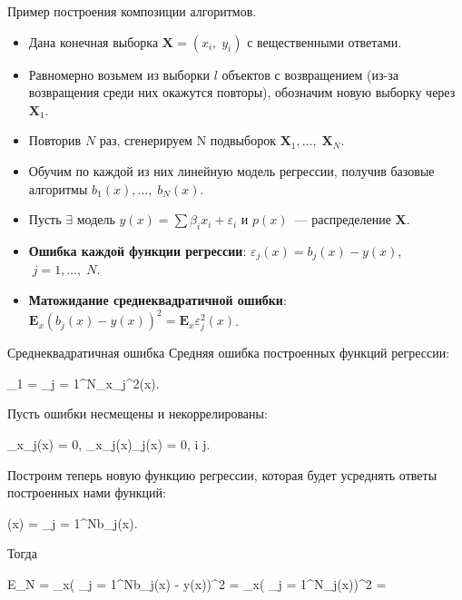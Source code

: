 \documentclass[notheorems, handout]{beamer}
\begin{document}
\begin{frame}{Пример построения композиции алгоритмов.}
	\begin{itemize}
		\item Дана конечная выборка $\mathbf{X} = (x_{i}{,}\;y_{i})$ с вещественными ответами.
		\item Равномерно возьмем из выборки $l$ объектов с возвращением (из-за возвращения среди них окажутся повторы), обозначим новую выборку через $\mathbf{X}_{1}$.
		\item Повторив $N$ раз, сгенерируем N подвыборок $\mathbf{X}_{1}{,} \dots{,}\; \mathbf{X}_{N}$.
		\item Обучим по каждой из  них линейную модель регрессии, получив базовые алгоритмы $b_{1}(x), \dots,\; b_{N}(x)$.
		\item Пусть $\exists$ модель $y(x) = \displaystyle\sum \beta_{i}x_{i} + \varepsilon_{i}$ и $p(x)$~--- распределение $\mathbf{X}$.
		\item \textbf{Ошибка каждой функции регрессии}: $\varepsilon_{j}(x) = b_{j}(x) - y(x)$, $\;j = 1, \dots,\;N$.
		\item \textbf{Матожидание среднеквадратичной ошибки}: $\mathbf{E}_{x}{(b_{j}(x) - y(x))}^{2} = \mathbf{E}_{x}\varepsilon_{j}^{2}(x)$.
	\end{itemize}
\end{frame}

\begin{frame}{Среднеквадратичная ошибка}
	Средняя ошибка построенных функций регрессии:
	\begin{flalign*}
		_{1} =  \displaystyle\sum_{j = 1}^{N}_{x}\varepsilon_{j}^{2}(x). 
	\end{flalign*}
	\par\smallskip
	Пусть ошибки несмещены и некоррелированы: 
	\begin{flalign*}
		_{x}\varepsilon_{j}(x) = 0, \;\;\; _{x}\varepsilon_{j}(x)\varepsilon_{j}(x) = 0, \;\;\; i \neq j.
	\end{flalign*}
	\par\smallskip
	Построим теперь новую функцию регрессии, которая будет усреднять ответы построенных нами функций: 
	\begin{flalign*}
		\alpha(x) = \displaystyle\sum_{j = 1}^{N}b_{j}(x).
	\end{flalign*}
	\par\smallskip
	Тогда
	\begin{flalign*}
		E_{N} = _{x}{\left( \displaystyle\sum_{j = 1}^{N}b_{j}(x) - y(x)\right)}^{2} = _{x}{\left( \displaystyle\sum_{j = 1}^{N}\varepsilon_{j}(x)\right)}^{2} = 
	\end{flalign*}
\end{frame}
\end{document}
